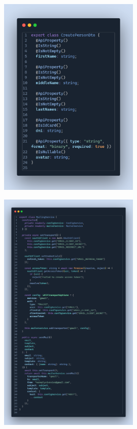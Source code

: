 \label{apendix:validacion-datos-api}
\begin{figure}[H]
    \centering
    \includegraphics[width=0.6\textwidth]{chapters/appendices/code/validacion-datos-api.png}
\end{figure}


\label{apendix:envio-correos-api}
\begin{figure}[H]
    \centering
    \includegraphics[width=0.6\textwidth]{chapters/appendices/code/envio-correos-api.png}
\end{figure}



